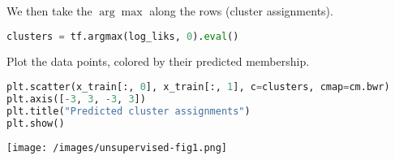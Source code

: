 We then take the $\arg\max$ along the rows (cluster assignments).
\begin{lstlisting}[language=Python]
clusters = tf.argmax(log_liks, 0).eval()
\end{lstlisting}

Plot the data points, colored by their predicted membership.
\begin{lstlisting}[language=Python]
plt.scatter(x_train[:, 0], x_train[:, 1], c=clusters, cmap=cm.bwr)
plt.axis([-3, 3, -3, 3])
plt.title("Predicted cluster assignments")
plt.show()
\end{lstlisting}

\texttt{[image: /images/unsupervised-fig1.png]}
